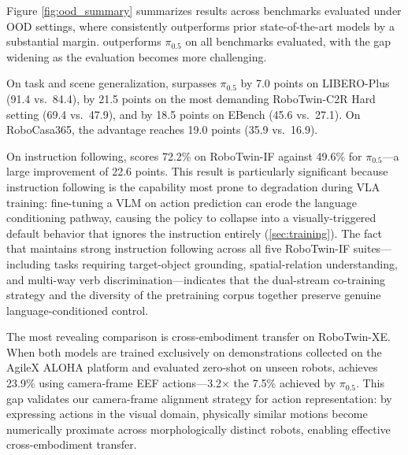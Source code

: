 Figure \ref{fig:ood_summary} summarizes results across benchmarks evaluated under OOD settings, where \ours consistently outperforms prior state-of-the-art models by a substantial margin. \ours outperforms $\pi_{0.5}$ on all benchmarks evaluated, with the gap widening as the evaluation becomes more challenging.

On task and scene generalization, \ours surpasses $\pi_{0.5}$ by 7.0 points on LIBERO-Plus (91.4 vs.\ 84.4), by 21.5 points on the most demanding RoboTwin-C2R Hard setting (69.4 vs.\ 47.9), and by 18.5 points on EBench (45.6 vs.\ 27.1). On RoboCasa365, the advantage reaches 19.0 points (35.9 vs.\ 16.9).

On instruction following, \ours scores 72.2\% on RoboTwin-IF against 49.6\% for $\pi_{0.5}$---a large improvement of 22.6 points. This result is particularly significant because instruction following is the capability most prone to degradation during VLA training: fine-tuning a VLM on action prediction can erode the language conditioning pathway, causing the policy to collapse into a visually-triggered default behavior that ignores the instruction entirely (\cref{sec:training}). The fact that \ours maintains strong instruction following across all five RoboTwin-IF suites---including tasks requiring target-object grounding, spatial-relation understanding, and multi-way verb discrimination---indicates that the dual-stream co-training strategy and the diversity of the pretraining corpus together preserve genuine language-conditioned control.

The most revealing comparison is cross-embodiment transfer on RoboTwin-XE. When both models are trained exclusively on demonstrations collected on the AgileX ALOHA platform and evaluated zero-shot on unseen robots, \ours achieves 23.9\% using camera-frame EEF actions---3.2$\times$ the 7.5\% achieved by $\pi_{0.5}$. This gap validates our camera-frame alignment strategy for action representation: by expressing actions in the visual domain, physically similar motions become numerically proximate across morphologically distinct robots, enabling effective cross-embodiment transfer.


